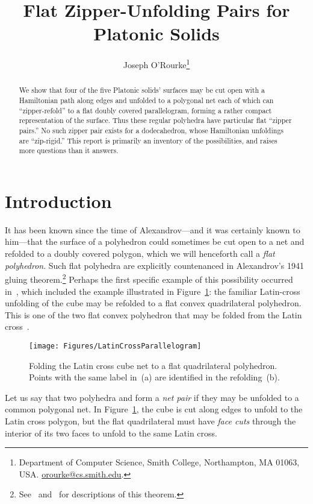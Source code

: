 \pdfoutput=1  \documentclass[]{article}
\title{Flat Zipper-Unfolding Pairs
for Platonic Solids
}
\author{Joseph O'Rourke\thanks{Department of Computer Science, Smith College, Northampton, MA
      01063, USA.
      \protect\url{orourke@cs.smith.edu}.}
}
\newcommand{\figlab}[1]{\label{fig:#1}}
\newcommand{\seclab}[1]{\label{sec:#1}}
\newcommand{\figref}[1]{\ref{fig:#1}}
\begin{document}
\maketitle

\begin{abstract}
We show that four of the five Platonic solids' surfaces may be cut open
with
a Hamiltonian path along edges and unfolded to a polygonal net
each of which can ``zipper-refold'' to a flat doubly covered
parallelogram,
forming a rather
compact representation of the surface.
Thus these regular polyhedra have particular flat ``zipper pairs.''
No such zipper pair exists for a dodecahedron, whose Hamiltonian
unfoldings are ``zip-rigid.''
This report is primarily an inventory of the possibilities, and raises
more questions than it answers.
\end{abstract}

\section{Introduction}
\seclab{Introduction}
It has been known since the time of Alexandrov---and it was certainly
known to him---that the surface of a polyhedron could sometimes be cut
open to a net and refolded to a doubly covered polygon, which we will
henceforth call a \emph{flat polyhedron}.
Such flat polyhedra are explicitly countenanced in Alexandrov's 1941
gluing theorem.\footnote{
See~\cite[Sec.~23.3]{do-gfalop-07}
and~\cite[Sec.~37]{p-ldpg-10} for descriptions of this theorem.
}
Perhaps the first specific example of this possibility occurred in~\cite{lo-wcpfp-96},
which included the example illustrated in
Figure~\figref{LatinCrossParallelogram}:
the familiar Latin-cross unfolding of the cube may be refolded to a
flat convex quadrilateral polyhedron.
This is one of the two flat convex polyhedron that may be folded
from
the Latin cross~\cite[Fig.~25.32]{do-gfalop-07}.
\begin{figure}[htbp]
\centering
\texttt{[image: Figures/LatinCrossParallelogram]}
\caption{Folding the Latin cross cube net to a flat
  quadrilateral polyhedron.
Points with the same label in~(a) are identified in the refolding~(b).}
\figlab{LatinCrossParallelogram}
\end{figure}


Let us say that two polyhedra  and  form a \emph{net pair}
if they may be unfolded to a common polygonal net.
In Figure~\figref{LatinCrossParallelogram}, the cube is cut along
edges to unfold to the Latin cross polygon,
but the flat quadrilateral must have \emph{face cuts} through the interior
of its two faces to unfold to the same Latin cross.
\end{document}
